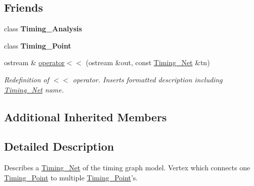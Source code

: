 \subsection*{Friends}
\begin{DoxyCompactItemize}
\item 
\hypertarget{classTiming__Analysis_1_1Timing__Net_aab560f9cdcd55852a6a08a29a54a2b16}{class {\bfseries Timing\-\_\-\-Analysis}}\label{classTiming__Analysis_1_1Timing__Net_aab560f9cdcd55852a6a08a29a54a2b16}

\item 
\hypertarget{classTiming__Analysis_1_1Timing__Net_a2562d249ea959d9e392abdffe35cdbad}{class {\bfseries Timing\-\_\-\-Point}}\label{classTiming__Analysis_1_1Timing__Net_a2562d249ea959d9e392abdffe35cdbad}

\item 
ostream \& \hyperlink{classTiming__Analysis_1_1Timing__Net_affa1b519dc847065ac579b4c8726c740}{operator$<$$<$} (ostream \&out, const \hyperlink{classTiming__Analysis_1_1Timing__Net}{Timing\-\_\-\-Net} \&tn)
\begin{DoxyCompactList}\small\item\em Redefinition of $<$$<$ operator. Inserts formatted description including \hyperlink{classTiming__Analysis_1_1Timing__Net}{Timing\-\_\-\-Net} name. \end{DoxyCompactList}\end{DoxyCompactItemize}
\subsection*{Additional Inherited Members}


\subsection{Detailed Description}
Describes a \hyperlink{classTiming__Analysis_1_1Timing__Net}{Timing\-\_\-\-Net} of the timing graph model. Vertex which connects one \hyperlink{classTiming__Analysis_1_1Timing__Point}{Timing\-\_\-\-Point} to multiple \hyperlink{classTiming__Analysis_1_1Timing__Point}{Timing\-\_\-\-Point}'s. 



